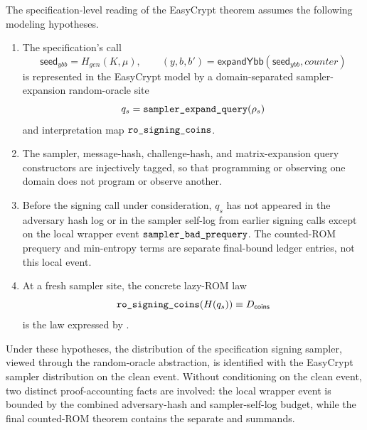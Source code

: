 \begin{assumption}
\label{assm:signing-randomness-modeling-bridge}
The specification-level reading of the EasyCrypt theorem assumes the following
modeling hypotheses.
\begin{enumerate}[label=\arabic*.]
\item The specification's call
\[
  \mathsf{seed}_{ybb}=H_{gen}(K,\mu),
  \qquad
  (y,b,b')=\mathsf{expandYbb}(\mathsf{seed}_{ybb},counter)
\]
is represented in the EasyCrypt model by a domain-separated sampler-expansion
random-oracle site
\[
  q_s=\texttt{sampler\_expand\_query}(\rho_s)
\]
and interpretation map \(\texttt{ro\_signing\_coins}\).
\item The sampler, message-hash, challenge-hash, and matrix-expansion query
constructors are injectively tagged, so that programming or observing one domain
does not program or observe another.
\item Before the signing call under consideration, \(q_s\) has not appeared in
the adversary hash log or in the sampler self-log from earlier signing calls
except on the local wrapper event \(\texttt{sampler\_bad\_prequery}\).  The
counted-ROM prequery and min-entropy terms are separate final-bound ledger
entries, not this local event.
\item At a fresh sampler site, the concrete lazy-ROM law
\[
  \texttt{ro\_signing\_coins}(H(q_s)) \equiv D_{\mathsf{coins}}
\]
is the law expressed by
.
\end{enumerate}
Under these hypotheses, the distribution of the specification signing sampler,
viewed through the random-oracle abstraction, is identified with the EasyCrypt
sampler distribution on the clean event.  Without conditioning on the clean
event, two distinct proof-accounting facts are involved: the local
 wrapper event is bounded by the combined
adversary-hash and sampler-self-log budget, while the final counted-ROM theorem
contains the separate  and
 summands.
\end{assumption}

